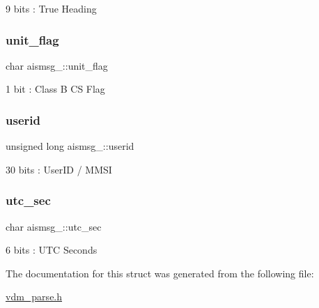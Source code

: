 9 bits \+: True Heading 

\mbox{\label{structaismsg__18_a57732ace4f42c2240ab3744b61420680}} 
\subsubsection{\texorpdfstring{unit\+\_\+flag}{unit\_flag}}
{\footnotesize\ttfamily char aismsg\+\_\+::unit\+\_\+flag}



1 bit \+: Class B CS Flag 

\mbox{\label{structaismsg__18_ab335d571702a0d31b3503e6e2ea32915}} 
\subsubsection{\texorpdfstring{userid}{userid}}
{\footnotesize\ttfamily unsigned long aismsg\+\_\+::userid}



30 bits \+: User\+ID / M\+M\+SI 

\mbox{\label{structaismsg__18_afb1c5d241b518e43e8dd43849867c805}} 
\subsubsection{\texorpdfstring{utc\+\_\+sec}{utc\_sec}}
{\footnotesize\ttfamily char aismsg\+\_\+::utc\+\_\+sec}



6 bits \+: U\+TC Seconds 



The documentation for this struct was generated from the following file\+:\begin{DoxyCompactItemize}
\item 
\mbox{\hyperlink{vdm__parse_8h}{vdm\+\_\+parse.\+h}}\end{DoxyCompactItemize}
